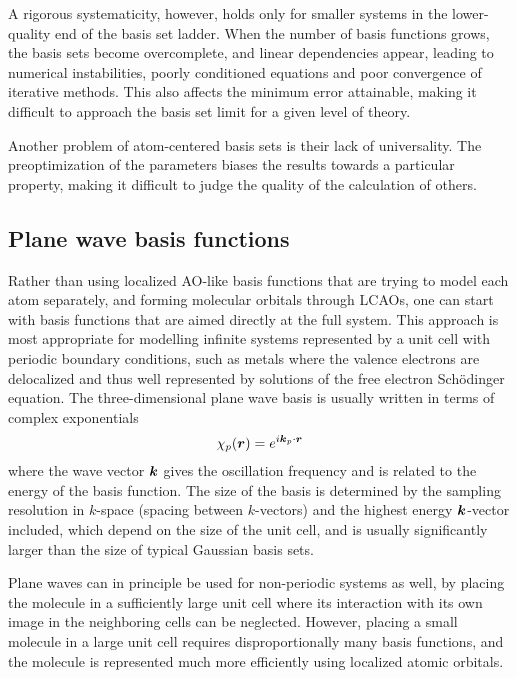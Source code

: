 A rigorous systematicity, however, holds only for smaller systems in the lower-quality end of the basis
set ladder. When the number of basis functions grows, the basis sets become overcomplete, and linear
dependencies appear, leading to numerical instabilities, poorly conditioned equations and poor
convergence of iterative methods. This also affects the minimum error attainable, making it difficult 
to approach the basis set limit for a given level of theory.

Another problem of atom-centered basis sets is their lack of universality. The preoptimization of the
parameters biases the results towards a particular property, making it difficult to judge the quality 
of the calculation of others.

\subsection{Plane wave basis functions}
Rather than using localized AO-like basis functions that are trying to model each atom separately,
and forming molecular orbitals through LCAOs, one can start with basis functions that are aimed directly
at the full system. This approach is most appropriate for modelling infinite systems represented by
a unit cell with periodic boundary conditions, such as metals where the valence electrons are delocalized
and thus well represented by solutions of the free electron Sch\"{o}dinger equation. The three-dimensional 
plane wave basis is usually written in terms of complex exponentials
\begin{equation}
    \chi_p(\boldsymbol r) = e^{i\boldsymbol k_p\cdot\boldsymbol r}
\end{equation}
where the wave vector $\boldsymbol k$ gives the oscillation frequency and is related to the energy of the basis
function. The size of the basis is determined by the sampling resolution in $k$-space (spacing between 
$k$-vectors) and the highest energy $\boldsymbol k$-vector included, which depend on the size of the unit cell,
and is usually significantly larger than the size of typical Gaussian basis sets. 

Plane waves can in principle be used
for non-periodic systems as well, by placing the molecule in a sufficiently large unit cell where its 
interaction with its own image in the neighboring cells can be neglected. However, placing a small
molecule in a large unit cell requires disproportionally many basis functions, and the molecule is 
represented much more efficiently using localized atomic orbitals.


